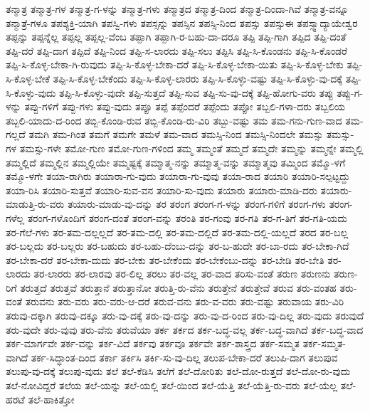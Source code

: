 {ತನ್ಮಾತ್ರ
ತನ್ಮಾತ್ರ-ಗಳ
ತನ್ಮಾತ್ರ-ಗ-ಳನ್ನು
ತನ್ಮಾತ್ರ-ಗಳು
ತನ್ಮಾತ್ರದ
ತನ್ಮಾತ್ರ-ದಿಂದ
ತನ್ಮಾತ್ರ-ದಿಂದಾ-ಗಿವೆ
ತನ್ಮಾತ್ರ-ವನ್ನೂ
ತನ್ಮಾತ್ರೆ-ಗಳೂ
ತಪಶ್ಯಕ್ತಿ-ಯಾಗಿ
ತಪಸ್ವಿ-ಗಳು
ತಪಸ್ಸನ್ನು
ತಪಸ್ಸಿನ
ತಪಸ್ಸಿ-ನಿಂದ
ತಪಸ್ಸು
ತಪಸ್ಸುಈ
ತಪಸ್ಸ್ವಾದ್ಯಾಯೇಶ್ವರ
ತಪ್ಪನ್ನು
ತಪ್ಪನ್ನೆಲ್ಲ
ತಪ್ಪಲ್ಲ
ತಪ್ಪಲ್ಲ-ವೆಂಬ
ತಪ್ಪಾಗಿ
ತಪ್ಪಾಗಿ-ರ-ಬಹು-ದಾ-ದರೂ
ತಪ್ಪಿ
ತಪ್ಪಿ-ಗಾಗಿ
ತಪ್ಪಿದ
ತಪ್ಪಿ-ದಂತೆ
ತಪ್ಪಿ-ದರೆ
ತಪ್ಪಿ-ದಾಗ
ತಪ್ಪಿದೆ
ತಪ್ಪಿ-ನಿಂದ
ತಪ್ಪಿ-ಸ-ಲಾರದು
ತಪ್ಪಿ-ಸಲು
ತಪ್ಪಿಸಿ
ತಪ್ಪಿ-ಸಿ-ಕೊಂಡನು
ತಪ್ಪಿ-ಸಿ-ಕೊಂಡರೆ
ತಪ್ಪಿ-ಸಿ-ಕೊಳ್ಳ-ಬೇಕಾ-ಗಿ-ರುವುದು
ತಪ್ಪಿ-ಸಿ-ಕೊಳ್ಳ-ಬೇಕಾ-ದರೆ
ತಪ್ಪಿ-ಸಿ-ಕೊಳ್ಳ-ಬೇಕಾ-ಯಿತು
ತಪ್ಪಿ-ಸಿ-ಕೊಳ್ಳ-ಬೇಕು
ತಪ್ಪಿ-ಸಿ-ಕೊಳ್ಳ-ಬೇಕೆ
ತಪ್ಪಿ-ಸಿ-ಕೊಳ್ಳ-ಬೇಕೆಂದು
ತಪ್ಪಿ-ಸಿ-ಕೊಳ್ಳ-ಲಾರರು
ತಪ್ಪಿ-ಸಿ-ಕೊಳ್ಳು-ವಷ್ಟು
ತಪ್ಪಿ-ಸಿ-ಕೊಳ್ಳು-ವು-ದಕ್ಕೆ
ತಪ್ಪಿ-ಸಿ-ಕೊಳ್ಳು-ವುದು
ತಪ್ಪಿ-ಸಿ-ಕೊಳ್ಳು-ವುದೇ
ತಪ್ಪಿ-ಸುತ್ತದೆ
ತಪ್ಪಿ-ಸುವ
ತಪ್ಪಿ-ಸು-ವು-ದಕ್ಕೆ
ತಪ್ಪಿ-ಹೋಗು-ವರು
ತಪ್ಪು
ತಪ್ಪು-ಗ-ಳನ್ನು
ತಪ್ಪು-ಗಳಿಗೆ
ತಪ್ಪು-ಗಳು
ತಪ್ಪು-ವುದು
ತಪ್ಪೂ
ತಪ್ಪೆ
ತಪ್ಪೆಂದರೆ
ತಪ್ಪೆಂದು
ತಪ್ಪೋ
ತಬ್ಬಲಿ-ಗಳಾ-ದರು
ತಬ್ಬಲಿಯ
ತಬ್ಬಲಿ-ಯಾದು-ದ-ರಿಂದ
ತಬ್ಬಿ-ಕೊಂಡಿ-ರುವ
ತಬ್ಬಿ-ಕೊಂಡಿ-ರು-ವಿರಿ
ತಬ್ಬು-ವಷ್ಟು
ತಮ
ತಮ-ಗನು-ಗುಣ-ವಾದ
ತಮ-ಗಲ್ಲದೆ
ತಮಗಿ
ತಮ-ಗಿಂತ
ತಮಗೆ
ತಮಗೇ
ತಮಳೆ
ತಮ-ವಾದ
ತಮಸ್ಸಿ-ನಿಂದ
ತಮಸ್ಸಿ-ನಿಂದಲೇ
ತಮಸ್ಸು
ತಮಸ್ಸು-ಗಳ
ತಮಸ್ಸು-ಗಳೇ
ತಮೋ-ಗುಣ
ತಮೋ-ಗುಣ-ಗಳಿಂದ
ತಮ್ಮ
ತಮ್ಮಂತೆ
ತಮ್ಮದೆ
ತಮ್ಮದೇ
ತಮ್ಮನ್ನು
ತಮ್ಮನ್ನೇ
ತಮ್ಮಲ್ಲಿ
ತಮ್ಮಲ್ಲಿದೆ
ತಮ್ಮಲ್ಲಿನ
ತಮ್ಮಲ್ಲಿಯೇ
ತಮ್ಮಷ್ಟಕ್ಕೆ
ತಮ್ಮಾತ್ಮ-ನನ್ನು
ತಮ್ಮಾತ್ಮ-ವನ್ನು
ತಮ್ಮಾತ್ಮವು
ತಮ್ಮಿಂದ
ತಮ್ಮೊ-ಳಗೆ
ತಮ್ಮೊ-ಳಗೇ
ತಯಾ-ರಾಗಿರು
ತಯಾರಾ-ಗು-ವುದು
ತಯಾರಾ-ಗು-ವುವು
ತಯಾ-ರಾದ
ತಯಾರಿ
ತಯಾರಿ-ಸಲ್ಪಟ್ಟದ್ದು
ತಯಾ-ರಿಸಿ
ತಯಾರಿ-ಸುತ್ತವೆ
ತಯಾರಿ-ಸುವ-ವನ
ತಯಾರಿ-ಸು-ವುದು
ತಯಾರು
ತಯಾರು-ಮಾಡಿ-ದರು
ತಯಾರು-ಮಾಡುತ್ತಿ-ರು-ವರು
ತಯಾರು-ಮಾಡು-ವು-ದನ್ನು
ತರ
ತರಂಗ
ತರಂಗ-ಗ-ಳನ್ನು
ತರಂಗ-ಗಳಿಗೆ
ತರಂಗ-ಗಳು
ತರಂಗ-ಗಳೆಲ್ಲ
ತರಂಗ-ಗಳೊಂದಿಗೆ
ತರಂಗ-ದಂತೆ
ತರಂಗ-ವನ್ನು
ತರಂತಿ
ತರ-ಗಂವು
ತರ-ಗತಿ
ತರ-ಗ-ತಿಗೆ
ತರ-ಗತಿ-ಯದು
ತರ-ಗೆಲೆ-ಗಳು
ತರ-ತಮ-ದಲ್ಲಲ್ಲದೆ
ತರ-ತಮ-ದಲ್ಲಿ
ತರ-ತಮ-ದಲ್ಲಿದೆ
ತರ-ತಮ-ದಲ್ಲಿ-ಯಲ್ಲದೆ
ತರದ
ತರ-ಬಲ್ಲ
ತರ-ಬಲ್ಲದು
ತರ-ಬಲ್ಲರು
ತರ-ಬಹುದು
ತರ-ಬಹು-ದೆಂಬು-ದನ್ನು
ತರ-ಬ-ಹುದೇ
ತರ-ಬಾ-ರದು
ತರ-ಬೇಕಾ-ಗಿದೆ
ತರ-ಬೇಕಾ-ದರೆ
ತರ-ಬೇಕಾ-ದುದು
ತರ-ಬೇಕು
ತರ-ಬೇಕೆಂದು
ತರ-ಬೇಕೆಂಬು-ದನ್ನು
ತರ-ಬೇಡಿ
ತರ-ಬೇತಿ
ತರ-ಲಾರದು
ತರ-ಲಾರರು
ತರ-ಲಾರವು
ತರ-ಲಿಲ್ಲ
ತರಲು
ತರ-ವಲ್ಲ
ತರ-ವಾದ
ತರಿಸು-ವಂತೆ
ತರುಣ
ತರುಣನು
ತರುಣ-ರಿಗೆ
ತರುತ್ತದೆ
ತರುತ್ತವೆ
ತರುತ್ತಾನೆ
ತರುತ್ತಾನೋ
ತರುತ್ತಿ-ರು-ವೆನು
ತರುತ್ತೇನೆ
ತರುತ್ತೇವೆ
ತರುವ
ತರು-ವಂತಹ
ತರು-ವಂತೆ
ತರುವನು
ತರು-ವರು
ತರು-ವರು-ಆ-ದರೆ
ತರುವ-ವನು
ತರು-ವ-ವರು
ತರು-ವಷ್ಟು
ತರುವಾಯ
ತರು-ವಿರಿ
ತರುವು-ದಕ್ಕಾಗಿ
ತರುವು-ದಕ್ಕೂ
ತರು-ವು-ದಕ್ಕೆ
ತರು-ವು-ದನ್ನು
ತರು-ವು-ದ-ರಿಂದ
ತರು-ವು-ದಿಲ್ಲ
ತರು-ವುದು
ತರುವುದೆ
ತರು-ವುದೇ
ತರು-ವುವು
ತರು-ವೆನು
ತರುವೆಯಾ
ತರ್ಕ
ತರ್ಕದ
ತರ್ಕ-ಬದ್ಧ-ವಲ್ಲ
ತರ್ಕ-ಬದ್ಧ-ವಾಗಿದೆ
ತರ್ಕ-ಬದ್ಧ-ವಾದ
ತರ್ಕ-ಮಾರ್ಗವೇ
ತರ್ಕ-ವನ್ನು
ತರ್ಕ-ವಿದೆ
ತರ್ಕವು
ತರ್ಕವೂ
ತರ್ಕವೇ
ತರ್ಕ-ಶಾಸ್ತ್ರದ
ತರ್ಕ-ಸಮ್ಮತ
ತರ್ಕ-ಸಮ್ಮತ-ವಾಗಿದೆ
ತರ್ಕ-ಸಿದ್ಧಾಂತ-ದಿಂದ
ತರ್ಕಾ
ತರ್ಕಿಸಿ
ತರ್ಕಿ-ಸು-ವು-ದಿಲ್ಲ
ತಲುಪ-ಬೇಕಾ-ದರೆ
ತಲುಪಿ-ದಾಗ
ತಲುಪುವ
ತಲುಪು-ವು-ದಕ್ಕೆ
ತಲುಪು-ವುದು
ತಲೆ
ತಲೆ-ಕೆಡಿಸಿ
ತಲೆಗೆ
ತಲೆ-ದೋರಿತು
ತಲೆ-ದೋ-ರುತ್ತದೆ
ತಲೆ-ದೋ-ರು-ವುದು
ತಲೆ-ನೋವಿದ್ದರೆ
ತಲೆಯ
ತಲೆ-ಯನ್ನು
ತಲೆ-ಯಲ್ಲಿ
ತಲೆ-ಯಿಂದ
ತಲೆ-ಯೆತ್ತಿ
ತಲೆ-ಯೆತ್ತಿ-ರು-ವರು
ತಲೆ-ಯೆಲ್ಲ
ತಲೆ-ಹರಟೆ
ತಲೆ-ಹಾಕಿತ್ತೋ
}
